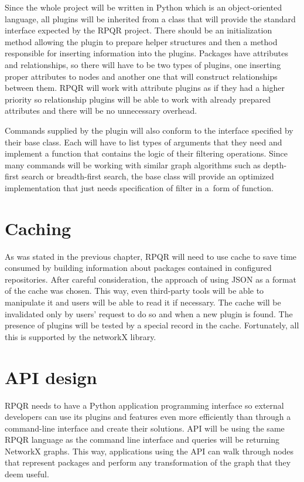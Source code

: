Since the whole project will be written in Python which is an object-oriented language, all plugins
will be inherited from a class that will provide the standard interface expected by the RPQR project. There
should be an initialization method allowing the plugin to prepare helper structures and then a method responsible
for inserting information into the plugins. Packages have attributes and relationships, so there 
will have to be two types of plugins, one inserting proper attributes to nodes and another one that
will construct relationships between them. RPQR will work with attribute plugins as if they had
a higher priority so relationship plugins will be able to work with already prepared attributes and
there will be no unnecessary overhead.

Commands supplied by the plugin will also conform to the interface specified by their base class. Each
will have to list types of arguments that they need and implement a function that contains the logic of
their filtering operations. Since many commands will be working with similar graph algorithms such as
depth-first search or breadth-first search, the base class will provide an optimized implementation that
just needs specification of filter in a~form of function.

\section{Caching}

As was stated in the previous chapter, RPQR will need to use cache to save time consumed by building information
about packages contained in configured repositories. After careful consideration, the approach of
using JSON as a format of the cache was chosen. This way, even third-party tools will be able to manipulate
it and users will be able to read it if necessary. The cache will be invalidated only by users'
request to do so and when a new plugin is found. The presence of plugins will be tested by a special record
in the cache. Fortunately, all this is supported by the networkX library.

\section{API design}
RPQR needs to have a Python application programming interface so external developers can use its plugins
and features even more efficiently than through a command-line interface and create their solutions.
API will be using the same RPQR language as the command line interface and queries will be returning
NetworkX graphs. This way, applications using the API can walk through nodes that represent packages
and perform any transformation of the graph that they deem useful.

